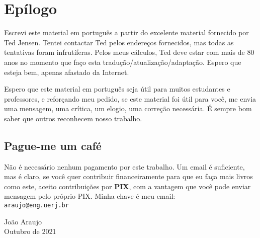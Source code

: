 
\chapter*{Epílogo}
Escrevi este material em português a partir do excelente material fornecido por Ted Jensen. Tentei contactar Ted pelos endereços fornecidos, mas todas as tentativas foram infrutíferas. Pelos meus cálculos, Ted deve estar com mais de 80 anos no momento que faço esta tradução/atualização/adaptação. Espero que esteja bem, apenas afastado da Internet.

Espero que este material em português seja útil para muitos estudantes e professores, e reforçando meu pedido, se este material foi útil para você, me envia uma mensagem, uma crítica, um elogio, uma correção necessária. É sempre bom saber que outros reconhecem nosso trabalho. 

\section*{Pague-me um café}
Não é necessário nenhum pagamento por este trabalho. Um email é suficiente, mas é claro, se você quer contribuir financeiramente para que eu faça mais livros como este, aceito contribuições por \textbf{PIX}, com a vantagem que você pode enviar mensagem pelo próprio PIX. Minha chave é meu email:\\
\texttt{araujo@eng.uerj.br} 

\begin{flushright}
	João Araujo\\
Outubro de 2021
\end{flushright}